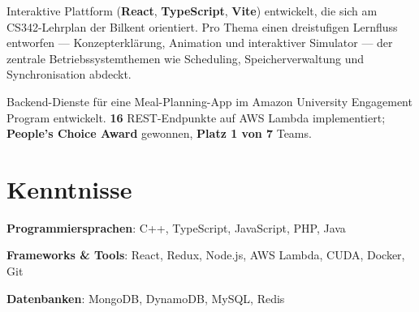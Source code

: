 {Interaktive Plattform (\textbf{React}, \textbf{TypeScript}, \textbf{Vite}) entwickelt, die sich am CS342-Lehrplan der Bilkent orientiert.}
\resumeItemListStart
    {Pro Thema einen dreistufigen Lernfluss entworfen — Konzepterklärung, Animation und interaktiver Simulator — der zentrale Betriebssystemthemen wie Scheduling, Speicherverwaltung und Synchronisation abdeckt.}
\resumeItemListEnd

{Backend-Dienste für eine Meal-Planning-App im Amazon University Engagement Program entwickelt.}
\resumeItemListStart
    {\textbf{16} REST-Endpunkte auf AWS Lambda implementiert; \textbf{People's Choice Award} gewonnen, \textbf{Platz 1 von 7} Teams.}
\resumeItemListEnd

  \resumeSubHeadingListEnd


\section{Kenntnisse}
 \resumeSubHeadingListStart
    \item{
      \textbf{Programmiersprachen}{: C++, TypeScript, JavaScript, PHP, Java}
    }
    \item{
      \textbf{Frameworks \& Tools}{: React, Redux, Node.js, AWS Lambda, CUDA, Docker, Git}
    }
    \item{
      \textbf{Datenbanken}{: MongoDB, DynamoDB, MySQL, Redis}
    }

 \resumeSubHeadingListEnd



